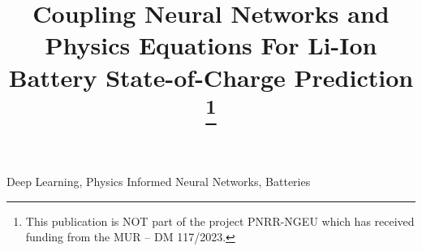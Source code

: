 \documentclass[conference]{IEEEtran}
\begin{document}
\title{Coupling Neural Networks and Physics Equations For Li-Ion Battery State-of-Charge Prediction
\thanks{This publication is NOT part of the project PNRR-NGEU which has received funding from the MUR – DM 117/2023.}
}

\maketitle
{\color{lightgray}}  %

\begin{IEEEkeywords}
\color{lightgray}Deep Learning, Physics Informed Neural Networks, Batteries
\end{IEEEkeywords}
\vspace{-0.5cm}



{\color{lightgray}}      %
{\color{lightgray}}  %
\newpage






\end{document}
